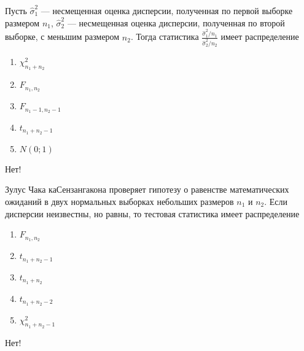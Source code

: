 \documentclass[t]{beamer}
\begin{document}
 \begin{frame} \label{55-No} 
\begin{block}{55} 

Пусть  $\hat{\sigma}^2_1$ — несмещенная оценка дисперсии, полученная по первой выборке размером $n_1$,   $\hat{\sigma}^2_2$ — несмещенная оценка дисперсии, полученная по второй выборке, с меньшим размером  $n_2$. Тогда статистика $\frac{\hat{\sigma}^2_1/n_1}{\hat{\sigma}^2_2/n_2}$  имеет распределение
 


 \end{block} 
\begin{enumerate} 
\item[] \hyperlink{55-No}{\beamergotobutton{} $\chi^2_{n_1+n_2}$}
\item[] \hyperlink{55-No}{\beamergotobutton{} $F_{n_1,n_2}$}
\item[] \hyperlink{55-No}{\beamergotobutton{} $F_{n_1-1,n_2-1}$}
\item[] \hyperlink{55-No}{\beamergotobutton{} $t_{n_1+n_2-1}$}
\item[] \hyperlink{55-No}{\beamergotobutton{} $N(0;1)$}
\end{enumerate} 

 \alert{Нет!} 
\end{frame} 


 \begin{frame} \label{56-No} 
\begin{block}{56} 

Зулус Чака каСензангакона проверяет гипотезу  о равенстве математических ожиданий в двух нормальных выборках небольших размеров $n_1$   и  $n_2$. Если дисперсии неизвестны, но равны, то тестовая статистика имеет распределение
 


 \end{block} 
\begin{enumerate} 
\item[] \hyperlink{56-No}{\beamergotobutton{} $F_{n_1,n_2}$}
\item[] \hyperlink{56-Yes}{\beamergotobutton{} $t_{n_1+n_2-1}$}
\item[] \hyperlink{56-No}{\beamergotobutton{} $t_{n_1+n_2}$}
\item[] \hyperlink{56-No}{\beamergotobutton{} $t_{n_1+n_2-2}$}
\item[] \hyperlink{56-No}{\beamergotobutton{} $\chi^2_{n_1+n_2-1}$}
\end{enumerate} 

 \alert{Нет!} 
\end{frame} 
\end{document}
